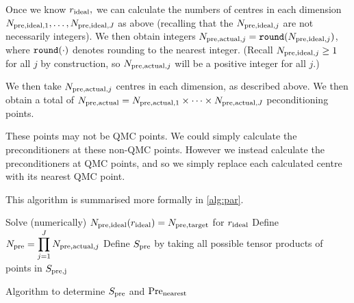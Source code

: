     Once we know $r_{\mathrm{ideal}},$ we can calculate the numbers of centres in each dimension $N_{\mathrm{pre,ideal},1},\ldots,N_{\mathrm{pre,ideal},J}$ as above (recalling that the $N_{\mathrm{pre,ideal},j}$ are not necessarily integers). We then obtain integers $\Npreactualj = \round{\Npreidealj}$, where $\round{\cdot}$ denotes rounding to the nearest integer. (Recall $N_{\mathrm{pre,ideal},j} \geq 1$ for all $j$ by construction, so $N_{\mathrm{pre,actual},j}$ will be a positive integer for all $j.$)

We then take $N_{\mathrm{pre,actual},j}$ centres in each dimension, as described above. We then obtain a total of $N_{\mathrm{pre,actual}} = N_{\mathrm{pre,actual},1} \times \cdots \times N_{\mathrm{pre,actual},J}$ peconditioning points.

These points may not be QMC points. We could simply calculate the preconditioners at these non-QMC points. However we instead calculate the preconditioners at QMC points, and so we simply replace each calculated centre with its nearest QMC point.

    This algorithm is summarised more formally in \cref{alg:par}.
    
    



\begin{algorithm}[h]
\DontPrintSemicolon
{}

\Input{$\Npretarget \in \NN$}
\Output{$\Spre$, $\nearestpre$}
\BlankLine
Solve (numerically) $N_{\mathrm{pre,ideal}}(r_{\mathrm{ideal}}) = N_{\mathrm{pre,target}}$ for $r_{\mathrm{ideal}}$\;
Define $\displaystyle N_{\mathrm{pre}} = \prod_{j=1}^J N_{\mathrm{pre,actual},j}$\;
Define $\Spre$ by taking all possible tensor products of points in $S_{\mathrm{pre,j}}$\;
\caption{Algorithm to determine $\Spre$ and $\nearestpre$\label{alg:par}}
\end{algorithm}

